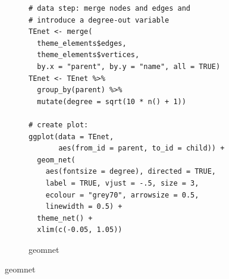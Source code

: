 \begin{figure}[hbtp]
\begin{subfigure}[t]{\textwidth}
\begin{adjustbox}{valign=t}
\begin{minipage}{.49\textwidth}
                          \end{minipage}

                          \end{adjustbox}
\end{subfigure}
%
\begin{subfigure}[t]{\textwidth}
\caption{geomnet}
\vspace{1em}

             \begin{adjustbox}{valign=t}

             \begin{minipage}{.49\textwidth}
 \begin{knitrout}\footnotesize
{}\color{fgcolor}\begin{kframe}
\begin{verbatim}
# data step: merge nodes and edges and
# introduce a degree-out variable
TEnet <- merge(
  theme_elements$edges,
  theme_elements$vertices,
  by.x = "parent", by.y = "name", all = TRUE)
TEnet <- TEnet %>%
  group_by(parent) %>%
  mutate(degree = sqrt(10 * n() + 1))

# create plot:
ggplot(data = TEnet,
       aes(from_id = parent, to_id = child)) +
  geom_net(
    aes(fontsize = degree), directed = TRUE,
    label = TRUE, vjust = -.5, size = 3,
    ecolour = "grey70", arrowsize = 0.5,
    linewidth = 0.5) +
  theme_net() +
  xlim(c(-0.05, 1.05))
\end{verbatim}
\end{kframe}
\end{knitrout} \vspace{1em}

                   \end{minipage}

                  \begin{minipage}{.49\textwidth}


\end{minipage}
\end{adjustbox}
\end{subfigure}
\end{figure}
